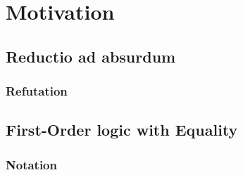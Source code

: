 
\section{Motivation}

\subsection{Reductio ad absurdum}

\begin{frame}
	\frametitle{Refutation}
	
	
\end{frame}

\subsection{First-Order logic with Equality}

\begin{frame}
	\frametitle{Notation}
	
\end{frame}



\begin{frame}
	
\end{frame}

\begin{frame}
	
	\pause
	
\end{frame}

\begin{frame}
	
\end{frame}
	

